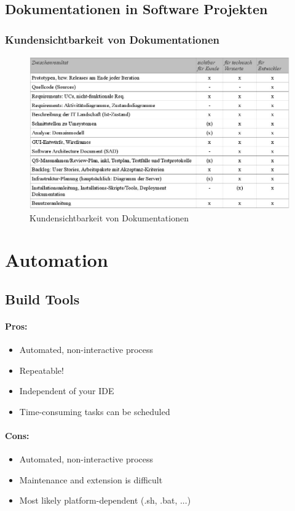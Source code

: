 \subsection{Dokumentationen in Software Projekten}

\subsubsection{Kundensichtbarkeit von Dokumentationen}

\begin{figure}[h]
	\centering
	\includegraphics[width=0.9\linewidth]{img/dokumentationen_abgaben_kunde}
	\caption{Kundensichtbarkeit von Dokumentationen}
	\label{fig:dokumentationenabgabenkunde}
\end{figure}

\section{Automation}

\subsection{Build Tools}

\paragraph{Pros:} 
\begin{itemize}
	\item Automated, non-interactive process
	\item Repeatable!
	\item Independent of your IDE
	\item Time-consuming tasks can be scheduled
\end{itemize}

\paragraph{Cons:}
\begin{itemize}
	\item Automated, non-interactive process
	\item Maintenance and extension is difficult
	\item Most likely platform-dependent (.sh, .bat, ...)
\end{itemize}

